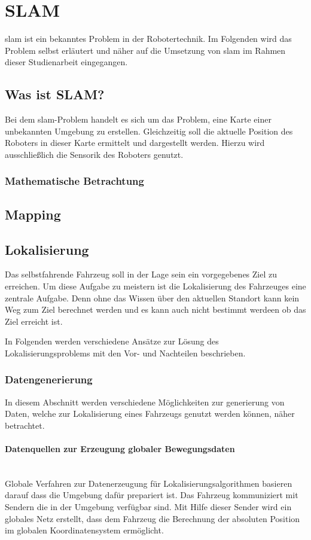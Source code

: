 \section{SLAM}
\ac{slam} ist ein bekanntes Problem in der Robotertechnik. 
Im Folgenden wird das Problem selbst erläutert und näher auf die Umsetzung von \ac{slam} im Rahmen dieser Studienarbeit eingegangen.

\subsection{Was ist SLAM?}
Bei dem \ac{slam}-Problem handelt es sich um das Problem, eine Karte einer unbekannten Umgebung zu erstellen.
Gleichzeitig soll die aktuelle Position des Roboters in dieser Karte ermittelt und dargestellt werden.
Hierzu wird ausschließlich die Sensorik des Roboters genutzt.

\subsubsection{Mathematische Betrachtung}


\subsection{Mapping}

\subsection{Lokalisierung}
Das selbstfahrende Fahrzeug soll in der Lage sein ein vorgegebenes Ziel zu erreichen. 
Um diese Aufgabe zu meistern ist die Lokalisierung des Fahrzeuges eine zentrale Aufgabe. 
Denn ohne das Wissen über den aktuellen Standort kann kein Weg zum Ziel berechnet werden 
und es kann auch nicht bestimmt werdeen ob das Ziel erreicht ist.

In Folgenden werden verschiedene Ansätze zur Lösung des Lokalisierungsproblems mit den Vor- und Nachteilen beschrieben.

\subsubsection{Datengenerierung}
In diesem Abschnitt werden verschiedene Möglichkeiten zur generierung von Daten, welche zur Lokalisierung eines Fahrzeugs genutzt werden können, näher betrachtet.

\paragraph{Datenquellen zur Erzeugung globaler Bewegungsdaten} \mbox{}\\
Globale Verfahren zur Datenerzeugung für Lokalisierungsalgorithmen basieren darauf dass die Umgebung dafür prepariert ist.
Das Fahrzeug kommuniziert mit Sendern die in der Umgebung verfügbar sind. 
Mit Hilfe dieser Sender wird ein globales Netz erstellt, dass dem Fahrzeug die Berechnung der absoluten Position im 
globalen Koordinatensystem ermöglicht.

